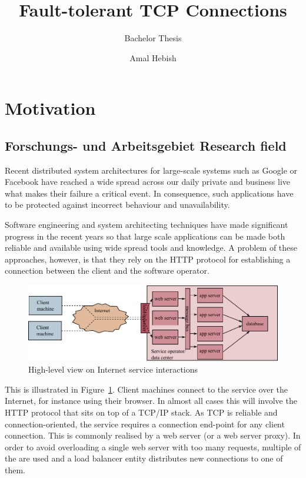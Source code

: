 \documentclass[10pt,a4paper,oneside]{scrartcl}
\title{Fault-tolerant TCP Connections}
\subtitle{Bachelor Thesis}
\author{Amal Hebish}
\newcommand\hint[2]{
\ifthenelse{\boolean{showhints}}{
\begin{center}
\colorbox{black!10}{
\begin{minipage}{.963\textwidth}
#2\hfill\textbf{#1}
\end{minipage}
}\end{center}}{}
}
\begin{document}

\maketitle

\section{Motivation}
\label{sec:motivation}

\subsection{
	{Forschungs- und Arbeitsgebiet}
	{Research field}}
\label{sub:field}

	Recent distributed system architectures for large-scale systems such as 
	Google or Facebook have reached a wide spread across our daily private and business
	live what makes their failure a critical event. In consequence, such applications have
	to be protected against incorrect behaviour and unavailability. 

	Software engineering and system architecting techniques have made significant progress 
	in the recent years so that large scale applications can be made both reliable and
	available using wide spread tools and knowledge. A problem of these approaches, however, 
	is that they rely on the HTTP protocol for establishing a connection between the client
	and the software operator.

\begin{figure}
 \begin{center}
	 \includegraphics[scale=.8]{./fig/setting}
 \end{center}
 \caption{\label{fig:setting}High-level view on Internet service interactions}
\end{figure}

	This is illustrated in Figure~\ref{fig:setting}. Client machines connect to the service
	over the Internet, for instance using their browser. In almost all cases this will involve
	the HTTP protocol that sits on top of a TCP/IP stack. As TCP is reliable and
	connection-oriented, the service requires a connection end-point for any client connection.
	This is commonly realised by a web server (or a web server proxy). In order to avoid
	overloading a single web server with too many requests, multiple of the are used and a load
	balancer entity distributes new connections to one of them. 
\end{document}
